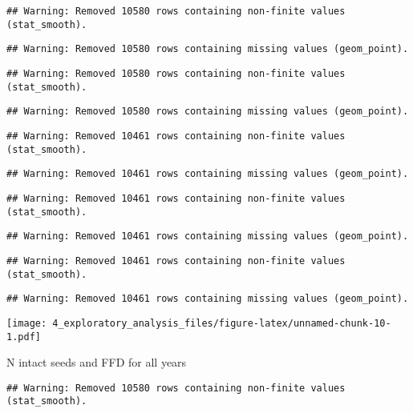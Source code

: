 \documentclass[]{article}
\begin{document}
\begin{verbatim}
## Warning: Removed 10580 rows containing non-finite values (stat_smooth).
\end{verbatim}

\begin{verbatim}
## Warning: Removed 10580 rows containing missing values (geom_point).
\end{verbatim}

\begin{verbatim}
## Warning: Removed 10580 rows containing non-finite values (stat_smooth).
\end{verbatim}

\begin{verbatim}
## Warning: Removed 10580 rows containing missing values (geom_point).
\end{verbatim}

\begin{verbatim}
## Warning: Removed 10461 rows containing non-finite values (stat_smooth).
\end{verbatim}

\begin{verbatim}
## Warning: Removed 10461 rows containing missing values (geom_point).
\end{verbatim}

\begin{verbatim}
## Warning: Removed 10461 rows containing non-finite values (stat_smooth).
\end{verbatim}

\begin{verbatim}
## Warning: Removed 10461 rows containing missing values (geom_point).
\end{verbatim}

\begin{verbatim}
## Warning: Removed 10461 rows containing non-finite values (stat_smooth).
\end{verbatim}

\begin{verbatim}
## Warning: Removed 10461 rows containing missing values (geom_point).
\end{verbatim}

\texttt{[image: 4\_exploratory\_analysis\_files/figure-latex/unnamed-chunk-10-1.pdf]}

N intact seeds and FFD for all years

\begin{verbatim}
## Warning: Removed 10580 rows containing non-finite values (stat_smooth).
\end{verbatim}
\end{document}
